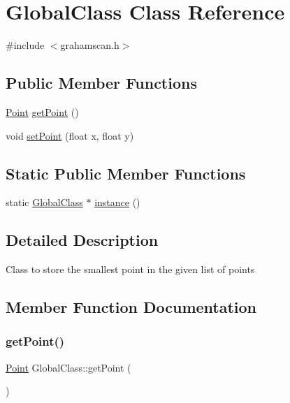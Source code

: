 \hypertarget{classGlobalClass}{}\section{Global\+Class Class Reference}
\label{classGlobalClass}


{\ttfamily \#include $<$grahamscan.\+h$>$}

\subsection*{Public Member Functions}
\begin{DoxyCompactItemize}
\item 
\hyperlink{classPoint}{Point} \hyperlink{classGlobalClass_a01ccd36a55121cbdd057c3d1438ec351}{get\+Point} ()
\item 
void \hyperlink{classGlobalClass_a896e0a641770d88a910d0f2da17066b8}{set\+Point} (float x, float y)
\end{DoxyCompactItemize}
\subsection*{Static Public Member Functions}
\begin{DoxyCompactItemize}
\item 
static \hyperlink{classGlobalClass}{Global\+Class} $\ast$ \hyperlink{classGlobalClass_ab368a73e98fc149de7191289c48622a2}{instance} ()
\end{DoxyCompactItemize}


\subsection{Detailed Description}
Class to store the smallest point in the given list of points 

\subsection{Member Function Documentation}
\mbox{\label{classGlobalClass_a01ccd36a55121cbdd057c3d1438ec351}} 
\subsubsection{\texorpdfstring{get\+Point()}{getPoint()}}
{\footnotesize\ttfamily \hyperlink{classPoint}{Point} Global\+Class\+::get\+Point (\begin{DoxyParamCaption}{ }\end{DoxyParamCaption})}

